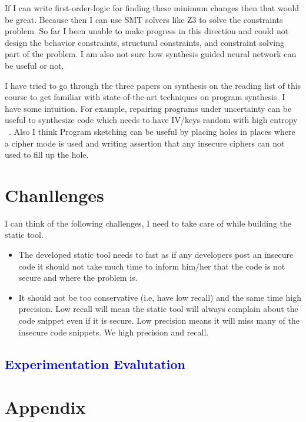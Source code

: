 \documentclass[sigconf]{acmart}
\begin{document}
If I can write first-order-logic for finding these minimum changes then that would be great. Because then I can use SMT solvers like Z3 to solve the constraints problem. 
So far I been unable to make progress in this direction and could not design the behavior constraints, structural constraints, and constraint solving part of the problem. I am also not sure how synthesis guided neural network can be useful or not. 

I have tried to go through the three papers on synthesis on the reading list of this course to get familiar with state-of-the-art techniques on program synthesis. I have some intuition. For example, repairing programs under uncertainty can be useful to synthesize code which needs to have IV/keys random with high entropy ~\cite{albarghouthi2017repairing}. Also I think Program sketching can be useful by placing holes in places where a cipher mode is used and writing assertion that any insecure ciphers can not used to fill up the hole.    

\section{Chanllenges}
I can think of the following challenges, I need to take care of while building the static tool.
\begin{itemize}
  \item The developed static tool needs to fast as if any developers post an insecure code it should not take much time to inform him/her that the code is not secure and where the problem is.
  \item It should not be too conservative (i.e, have low recall) and the same time high precision. Low recall will mean the static tool will always complain about the code snippet even if it is secure. Low precision means it will miss many of the insecure code snippets. We high precision and recall. 
\end{itemize}
\textcolor{blue}{
\section{Experimentation Evalutation}
}

  
  
\section{Appendix}

\end{document}
